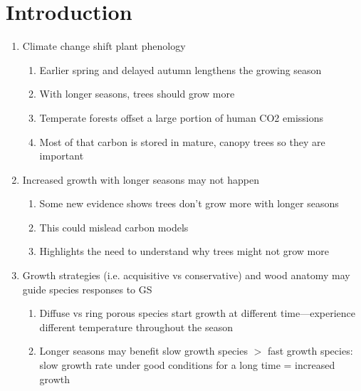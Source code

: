 \documentclass{article}\usepackage[]{graphicx}\usepackage[]{xcolor}
\begin{document}
\section*{Introduction}
\begin{enumerate}
\item Climate change shift plant phenology
  \begin{enumerate}
  
  \item Earlier spring and delayed autumn lengthens the growing season
  
  \item With longer seasons, trees should grow more
  
  \item Temperate forests offset a large portion of human CO2 emissions
  
  \item Most of that carbon is stored in mature, canopy trees so they are important
  \end{enumerate}

\item Increased growth with longer seasons may not happen
  \begin{enumerate}
  \item Some new evidence shows trees don't grow more with longer seasons
  
  \item This could mislead carbon models
  
  \item Highlights the need to understand why trees might not grow more
  
  \end{enumerate}
  
\item Growth strategies (i.e. acquisitive vs conservative) and wood anatomy may guide species responses to GS
  \begin{enumerate}
  
  \item Diffuse vs ring porous species start growth at different time---experience different temperature throughout the season
  
  \item Longer seasons may benefit slow growth species $>$ fast growth species: slow growth rate under good conditions for a long time = increased growth 
  

\end{enumerate}
\end{enumerate}
\end{document}
